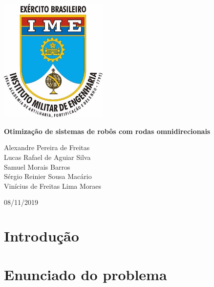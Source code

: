 \documentclass{article}
\begin{document}
\begin{titlepage}
    \begin{center}

        \includegraphics[width=0.4\textwidth]{ime.jpg}

        \vspace{1cm}

        \Huge
        \textbf{Otimização de sistemas de robôs com rodas omnidirecionais}
 
        \vspace{0.5cm}
        \LARGE
 
        \vspace{1.5cm}
 
        Alexandre Pereira de Freitas\\
        Lucas Rafael de Aguiar Silva\\
        Samuel Morais Barros\\
        Sérgio Reinier Sousa Macário\\
        Vinícius de Freitas Lima Moraes\\
 
        \vfill
 
        \vspace{0.8cm}
 
        \Large
        08/11/2019
 
    \end{center}
\end{titlepage}

\tableofcontents
\newpage

\section{Introdução}

\section{Enunciado do problema}
\end{document}
